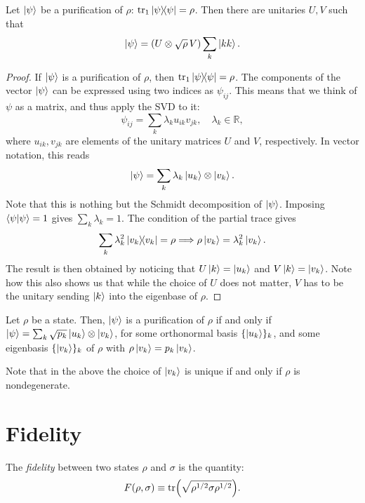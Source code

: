 \documentclass[12pt]{report}
\newcommand{\RR}{\mathbb{R}}
\begin{document}
\begin{prop}
	Let $\ket\psi$ be a purification of $\rho$: $\tr_1\ketbra\psi=\rho$. Then there are unitaries $U, V$ such that
	\begin{equation}
		\ket\psi=(U\otimes \sqrt\rho\,V)\sum_k \ket{kk}.
	\end{equation}
\end{prop}
\begin{proof}
	If $\ket\psi$ is a purification of $\rho$, then $\tr_1\ketbra\psi=\rho$.
	The components of the vector $\ket\psi$ can be expressed using two indices as $\psi_{ij}$. This means that we think of $\psi$ as a matrix, and thus apply the \ac{SVD} to it:
	\begin{equation}
		\psi_{ij} = \sum_k \lambda_k u_{ik} v_{jk},\quad
		\lambda_k\in\RR,
	\end{equation}
	where $u_{ik}, v_{jk}$ are elements of the unitary matrices $U$ and $V$, respectively. In vector notation, this reads
	\begin{equation}
		\ket\psi=\sum_k\lambda_k\ket{u_k}\otimes\ket{v_k}.
	\end{equation}
	Note that this is nothing but the Schmidt decomposition of $\ket\psi$.
	Imposing $\braket\psi=1$ gives $\sum_k \lambda_k=1$.
	The condition of the partial trace gives
	\begin{equation}
		\sum_k \lambda_k^2 \ketbra{v_k}=\rho
		\Longrightarrow \rho\ket{v_k}=\lambda_k^2\ket{v_k}.
	\end{equation}
	The result is then obtained by noticing that $U\ket k=\ket{u_k}$ and $V\ket k=\ket{v_k}$. Note how this also shows us that while the choice of $U$ does not matter, $V$ has to be the unitary sending $\ket k$ into the eigenbase of $\rho$.
\end{proof}

\begin{prop}
	Let $\rho$ be a state. Then, $\ket\psi$ is a purification of $\rho$ if and only if
	$\ket\psi=\sum_k\sqrt{p_k}\ket{u_k}\otimes\ket{v_k}$,
	for some orthonormal basis $\{\ket{u_k}\}_k$, and some eigenbasis $\{\ket{v_k}\}_k$ of $\rho$ with $\rho\ket{v_k}=p_k\ket{v_k}$.
\end{prop}
Note that in the above the choice of $\ket{v_k}$ is unique if and only if $\rho$ is nondegenerate.

\section{Fidelity}

\begin{defn}\label{def:fidelity}
	The \emph{fidelity} between two states $\rho$ and $\sigma$ is the quantity:
	\begin{equation}
		F(\rho,\sigma) \equiv \tr(\sqrt{\rho^{1/2}\sigma\rho^{1/2}}).
	\end{equation}
\end{defn}
\end{document}
